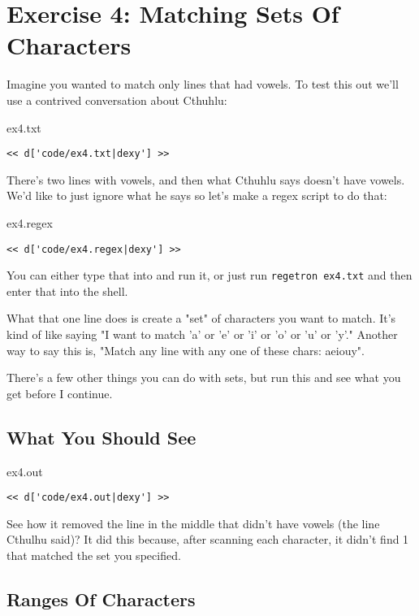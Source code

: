 \chapter{Exercise 4: Matching Sets Of Characters}

Imagine you wanted to match only lines that had vowels.  To test this out
we'll use a contrived conversation about Cthuhlu:

\begin{code}{ex4.txt}
\begin{Verbatim}
<< d['code/ex4.txt|dexy'] >>
\end{Verbatim}
\end{code}

There's two lines with vowels, and then what Cthuhlu says doesn't have vowels.
We'd like to just ignore what he says so let's make a regex script to do that:

\begin{code}{ex4.regex}
\begin{Verbatim}
<< d['code/ex4.regex|dexy'] >>
\end{Verbatim}
\end{code}

You can either type that into  and run it, or just run
\verb|regetron ex4.txt| and then enter that into the shell.

What that one line does is create a "set" of characters you want to match.
It's kind of like saying "I want to match 'a' or 'e' or 'i' or 'o' or 'u' or 'y'."
Another way to say this is, "Match any line with any one of these chars: aeiouy".

There's a few other things you can do with sets, but run this and see what you
get before I continue.

\section{What You Should See}

\begin{code}{ex4.out}
\begin{Verbatim}
<< d['code/ex4.out|dexy'] >>
\end{Verbatim}
\end{code}

See how it removed the line in the middle that didn't have vowels (the
line Cthulhu said)?  It did this because, after scanning each character,
it didn't find 1 that matched the set you specified.

\section{Ranges Of Characters}

